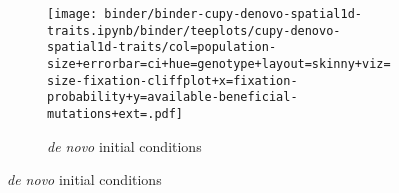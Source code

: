 \begin{figure}[h]
\begin{minipage}{\textwidth}
\begin{subfigure}[b]{\linewidth}
\begin{minipage}{0.25\textwidth}
        \end{minipage}%
      \begin{minipage}{0.12\textwidth}
        \raggedright
        \large
        \vspace{10ex}
        \caption{\textit{de novo} initial conditions}
        \label{fig:spatial-structure:denovo}

        \texttt{[image: binder/binder-cupy-denovo-spatial1d-traits.ipynb/binder/teeplots/cupy-denovo-spatial1d-traits/col=population-size+errorbar=ci+hue=genotype+layout=skinny+viz=size-fixation-cliffplot+x=fixation-probability+y=available-beneficial-mutations+ext=.pdf]}%
      \end{minipage}%
    \end{subfigure}%

  \end{minipage}

  \vspace{-10ex}


\end{figure}

